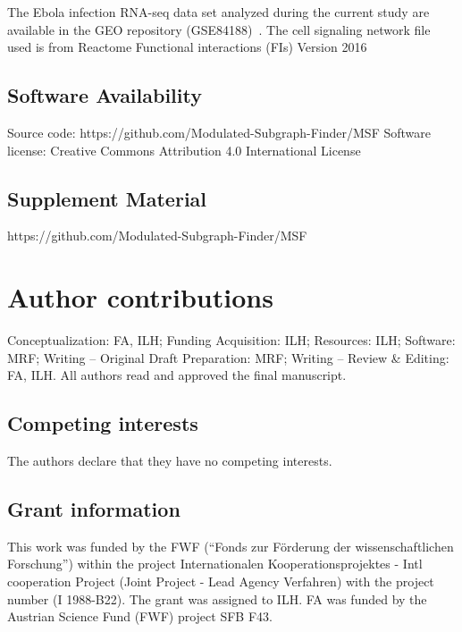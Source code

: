 \documentclass[10pt,a4paper,twocolumn]{article}
\begin{document}
The Ebola infection RNA-seq data set analyzed during the current study are
available in the GEO repository (GSE84188)~\cite{Olejnik}. The cell
signaling network file used is from Reactome Functional interactions (FIs)
Version 2016~\cite{Cytokegg}

\subsection*{Software Availability}

\noindent
Source code: \newline
https://github.com/Modulated-Subgraph-Finder/MSF \newline Software
license: Creative Commons Attribution 4.0 International License


\subsection*{Supplement Material}

\noindent
https://github.com/Modulated-Subgraph-Finder/MSF 

\section*{Author contributions}
Conceptualization: FA, ILH; Funding Acquisition: ILH; Resources: ILH;
Software: MRF; Writing – Original Draft Preparation: MRF; Writing – Review
\& Editing: FA, ILH. All authors read and approved the final manuscript.

\subsection*{Competing interests}

The authors declare that they have no competing interests.

\subsection*{Grant information}

This work was funded by the FWF (“Fonds zur F{\"o}rderung der
wissenschaftlichen Forschung”) within the project Internationalen
Kooperationsprojektes - Intl cooperation Project (Joint Project - Lead
Agency Verfahren) with the project number (I 1988-B22). The grant was
assigned to ILH. FA was funded by the Austrian Science Fund (FWF) project
SFB F43.


{\small
}
\end{document}
